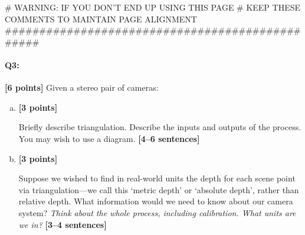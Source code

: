 \begin{enumerate}[(a)]
\begin{tcolorbox}[enhanced jigsaw,breakable,pad at break*=1mm,colback=white!5!white,colframe=green!75!black,height fixed for=all]
\begin{python}
    # WARNING: IF YOU DON'T END UP USING THIS PAGE
    # KEEP THESE COMMENTS TO MAINTAIN PAGE ALIGNMENT
    ################################################
    \end{python}
\end{tcolorbox}






\pagebreak
\paragraph{Q3:} \textbf{[6 points]} Given a stereo pair of cameras:
\begin{enumerate} [(a)]
\item \textbf{[3 points]} 
\begin{tcolorbox}[colback=orange!5!white,colframe=orange!75!black]
Briefly describe triangulation. Describe the inputs and outputs of the process. You may wish to use a diagram. \textbf{[4--6 sentences]}
\end{tcolorbox}


\pagebreak
\item \textbf{[3 points]} 
\begin{tcolorbox}[colback=orange!5!white,colframe=orange!75!black]
Suppose we wished to find in real-world units the depth for each scene point via triangulation---we call this `metric depth' or `absolute depth', rather than relative depth. What information would we need to know about our camera system? \emph{Think about the whole process, including calibration. What units are we in?} \textbf{[3--4 sentences]}
\end{tcolorbox}
\end{enumerate}
\end{enumerate}
